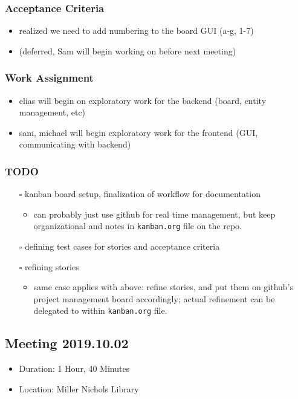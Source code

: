 \documentclass[11pt]{article}
\begin{document}
\subsubsection*{Acceptance Criteria}
\label{sec:orgf254cee}
\begin{itemize}
\item realized we need to add numbering to the board GUI (a-g, 1-7)
\item (deferred, Sam will begin working on before next meeting)
\end{itemize}
\subsubsection*{Work Assignment}
\label{sec:org390a171}
\begin{itemize}
\item elias will begin on exploratory work for the backend (board, entity management, etc)
\item sam, michael will begin exploratory work for the frontend (GUI, communicating with backend)
\end{itemize}
\subsubsection*{{\bfseries\sffamily TODO} }
\label{sec:org33164a1}
\begin{itemize}
\item[{$\square$}] kanban board setup, finalization of workflow for documentation
\begin{itemize}
\item can probably just use github for real time management, but keep organizational and notes in
\texttt{kanban.org} file on the repo.
\end{itemize}
\item[{$\square$}] defining test cases for stories and acceptance criteria
\item[{$\square$}] refining stories
\begin{itemize}
\item same case applies with above: refine stories, and put them on github's project management
board accordingly; actual refinement can be delegated to within \texttt{kanban.org} file.
\end{itemize}
\end{itemize}
\subsection{Meeting 2019.10.02}
\label{sec:org69ba46a}
\begin{itemize}
\item Duration: 1 Hour, 40 Minutes
\item Location: Miller Nichols Library
\end{itemize}
\end{document}
